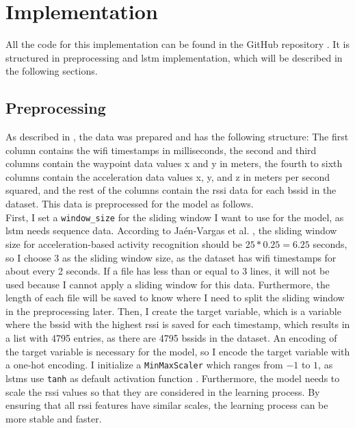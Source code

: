 \chapter{Implementation}\label{ch:implementation}

All the code for this implementation can be found in the GitHub repository \cite{github-repo}.
It is structured in preprocessing and \ac{lstm} implementation, which will be described in the following sections.

\section{Preprocessing}
As described in , the data was prepared and has the following structure:
The first column contains the \ac{wifi} timestamps in milliseconds, the second and third columns contain the waypoint data values x and y in meters, the fourth to sixth columns contain the acceleration data values x, y, and z in meters per second squared, and the rest of the columns contain the \ac{rssi} data for each \ac{bssid} in the dataset.
This data is preprocessed for the model as follows.\\
First, I set a \texttt{window\_size} for the sliding window I want to use for the model, as \ac{lstm} needs sequence data.
According to Ja{\'e}n-Vargas et al. \cite{EffectsSlidingWindow2022}, the sliding window size for acceleration-based activity recognition should be \(25 * 0.25 = 6.25\) seconds, so I choose \(3\) as the sliding window size, as the dataset has \ac{wifi} timestamps for about every 2 seconds.
If a file has less than or equal to \(3\) lines, it will not be used because I cannot apply a sliding window for this data.
Furthermore, the length of each file will be saved to know where I need to split the sliding window in the preprocessing later.
Then, I create the target variable, which is a variable where the \ac{bssid} with the highest \ac{rssi} is saved for each timestamp, which results in a list with 4795 entries, as there are 4795 \acp{bssid} in the dataset.
An encoding of the target variable is necessary for the model, so I encode the target variable with a one-hot encoding.
I initialize a \texttt{MinMaxScaler} which ranges from \(-1\) to \(1\), as \acp{lstm} use \texttt{tanh} as default activation function \cite{tanh-lstm-default}.
Furthermore, the model needs to scale the \ac{rssi} values so that they are considered in the learning process.
By ensuring that all \ac{rssi} features have similar scales, the learning process can be more stable and faster. 

